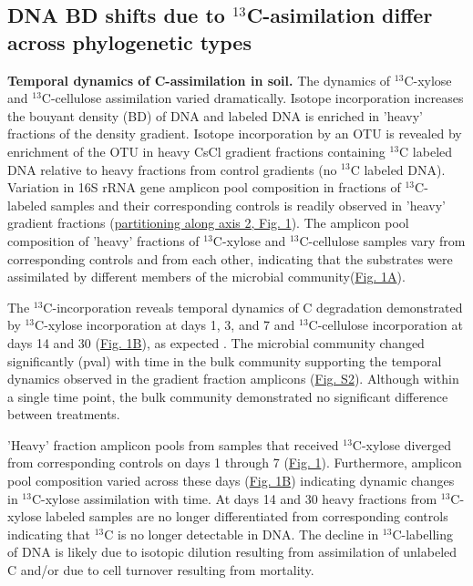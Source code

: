 \subsection{DNA BD shifts due
to $^{13}$C-asimilation differ across phylogenetic types} \textbf{Temporal
dynamics of C-assimilation in soil.}  The dynamics of $^{13}$C-xylose and
$^{13}$C-cellulose assimilation varied dramatically. Isotope incorporation
increases the bouyant density (BD) of DNA and labeled DNA is enriched in
'heavy' fractions of the density gradient.  Isotope incorporation by an OTU is
revealed by enrichment of the OTU in heavy CsCl gradient fractions containing
$^{13}$C labeled DNA relative to heavy fractions from control gradients (no
$^{13}$C labeled DNA). Variation in 16S rRNA gene amplicon pool composition in
fractions of $^{13}$C-labeled samples and their corresponding controls is
readily observed in 'heavy' gradient fractions
(\href{https://www.authorea.com/users/3537/articles/3612/master/file/figures/ordination_all1/ordination_all1.png}{partitioning
along axis 2, Fig. 1}). The amplicon pool composition of 'heavy' fractions of
$^{13}$C-xylose and $^{13}$C-cellulose samples vary from corresponding controls
and from each other, indicating that the substrates were assimilated by
different members of the  microbial
community(\href{https://www.authorea.com/users/3537/articles/3612/master/file/figures/ordination_all1/ordination_all1.png}{Fig.
1A}).

The $^{13}$C-incorporation reveals temporal dynamics of C degradation
demonstrated by $^{13}$C-xylose incorporation at days 1, 3, and 7 and
$^{13}$C-cellulose incorporation at days 14 and 30
(\href{https://www.authorea.com/users/3537/articles/3612/master/file/figures/ordination_all1/ordination_all1.png}{Fig.
1B}), as expected \citep{Amelung_2008}. The microbial community changed
significantly (pval) with time in the bulk community supporting the temporal
dynamics observed in the gradient fraction amplicons
(\href{https://authorea.com/users/3537/articles/8459/master/file/figures/bulk_ordination/bulk_ordination.png}{Fig.
S2}). Although within a single time point, the bulk community demonstrated no
significant difference between treatments. 

'Heavy' fraction amplicon pools from samples that received $^{13}$C-xylose
diverged from corresponding controls on days 1 through 7
(\href{https://www.authorea.com/users/3537/articles/3612/master/file/figures/ordination_all1/ordination_all1.png}{Fig.
1}). Furthermore, amplicon pool composition varied across these days
(\href{https://www.authorea.com/users/3537/articles/3612/master/file/figures/ordination_all1/ordination_all1.png}{Fig.
1B}) indicating dynamic changes in $^{13}$C-xylose assimilation with time. At
days 14 and 30 heavy fractions from $^{13}$C-xylose labeled samples are no
longer differentiated from corresponding controls indicating that $^{13}$C is
no longer detectable in DNA. The decline in $^{13}$C-labelling of DNA is likely
due to isotopic dilution resulting from assimilation of unlabeled C and/or due
to cell turnover resulting from mortality. 

